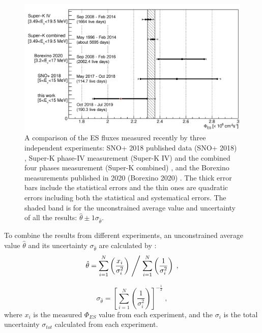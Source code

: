 \begin{figure}[!htb]
	\centering
	\includegraphics[width=14cm]{ESfluxCompare.png}
	\caption[A comparison of the ES flux measured recently by three independent experiments.]{A comparison of the ES fluxes measured recently by three independent experiments: SNO+ 2018 published data (SNO+ 2018) \cite{anderson2019measurement}, Super-K phase-IV measurement (Super-K IV) and the combined four phases measurement (Super-K combined) \cite{abe2016solar}, and the Borexino measurements published in 2020 (Borexino 2020) \cite{agostini2020improved}. The thick error bars include the statistical errors and the thin ones are quadratic errors including both the statistical and systematical errors. The shaded band is for the unconstrained average value and uncertainty of all the results: $\hat \theta \pm 1\sigma_{\hat \theta}$.\label{fig:ESfluxCompare}}
\end{figure}

To combine the results from different experiments, an unconstrained average value $\hat \theta$ and its uncertainty $\sigma_{\hat\theta}$ are calculated by \cite{pdg2020,behnke2013data}:
\begin{equation}
\hat \theta = \sum_{i=1}^{N} \left(\frac{x_i}{\sigma_i^2}\right)\Biggm/\sum_{i=1}^{N}\left(\frac{1}{\sigma_i^2}\right)\; ,
\end{equation}

\begin{equation}
\sigma_{\hat\theta} =\left[\sum_{i=1}^{N}\left(\frac{1}{\sigma_i^2}\right) \right]^{-\frac{1}{2}}\; ,
\end{equation}
where $x_i$ is the measured $\Phi_{ES}$ value from each experiment, and the $\sigma_i$ is the total uncertainty $\sigma_{tot}$ calculated from each experiment. 

